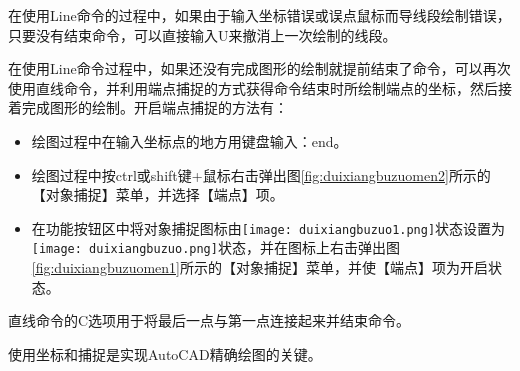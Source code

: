 \begin{tips}
\item 在使用Line命令的过程中，如果由于输入坐标错误或误点鼠标而导线段绘制错误，只要没有结束命令，可以直接输入U来撤消上一次绘制的线段。
\item 在使用Line命令过程中，如果还没有完成图形的绘制就提前结束了命令，可以再次使用直线命令，并利用端点捕捉的方式获得命令结束时所绘制端点的坐标，然后接着完成图形的绘制。开启端点捕捉的方法有：
\begin{itemize}
\item 绘图过程中在输入坐标点的地方用键盘输入：end。
\item 绘图过程中按ctrl或shift键+鼠标右击弹出图\ref{fig:duixiangbuzuomen2}所示的【对象捕捉】菜单，并选择【端点】项。
\begin{figure}[htbp]
\centering
\begin{floatrow}
\end{floatrow}
\end{figure}
\item 在功能按钮区中将对象捕捉图标由\texttt{[image: duixiangbuzuo1.png]}状态设置为\texttt{[image: duixiangbuzuo.png]}状态，并在图标上右击弹出图\ref{fig:duixiangbuzuomen1}所示的【对象捕捉】菜单，并使【端点】项为开启状态。
\end{itemize}
\item 直线命令的C选项用于将最后一点与第一点连接起来并结束命令。
\item 使用坐标和捕捉是实现AutoCAD精确绘图的关键。
\end{tips}



